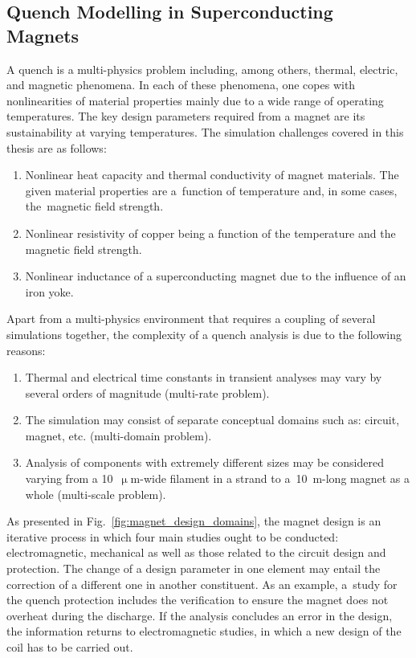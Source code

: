 
\subsection{Quench Modelling in Superconducting Magnets}

A quench is a multi-physics problem including, among others, thermal, electric, and magnetic phenomena. In each of these phenomena, one copes with nonlinearities of material properties mainly due to a wide range of operating temperatures. The key design parameters required from a magnet are its sustainability at varying temperatures. The simulation challenges covered in this thesis are as follows: 

\begin{enumerate}
    \item Nonlinear heat capacity and thermal conductivity of magnet materials. The given material properties are a~function of temperature and, in some cases, the~magnetic field strength. 
    \item Nonlinear resistivity of copper being a function of the temperature and the magnetic field strength.
    \item Nonlinear inductance of a superconducting magnet due to the influence of an iron yoke. 
\end{enumerate}

Apart from a multi-physics environment that requires a coupling of several simulations together, the complexity of a quench analysis is due to the following reasons: 
\begin{enumerate}
    \item Thermal and electrical time constants in transient analyses may vary by several orders of magnitude (multi-rate problem).
    \item The simulation may consist of separate conceptual domains such as: circuit, magnet, etc. (multi-domain problem).
    \item Analysis of components with extremely different sizes may be considered varying from a 10~$\upmu$m-wide filament in a strand to a~10~m-long magnet as a whole (multi-scale problem).
\end{enumerate}

As presented in Fig.~\ref{fig:magnet_design_domains}, the magnet design is an iterative process in which four main studies ought to be conducted: electromagnetic, mechanical as well as those related to the circuit design and protection. The change of a design parameter in one element may entail the correction of a different one in another constituent. As an example, a~study for the quench protection includes the verification to ensure the magnet does not overheat during the discharge. If the analysis concludes an error in the design, the information returns to electromagnetic studies, in which a new design of the coil has to be carried out.~\cite{quench_protection_system_applied_prioli}

